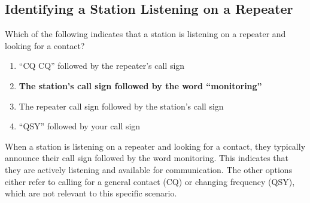 \subsection{Identifying a Station Listening on a Repeater}
\label{T2A09}

\begin{tcolorbox}[colback=gray!10!white,colframe=black!75!black,title=T2A09]
Which of the following indicates that a station is listening on a repeater and looking for a contact?
\begin{enumerate}[noitemsep]
    \item “CQ CQ” followed by the repeater’s call sign
    \item \textbf{The station’s call sign followed by the word “monitoring”}
    \item The repeater call sign followed by the station’s call sign
    \item “QSY” followed by your call sign
\end{enumerate}
\end{tcolorbox}

When a station is listening on a repeater and looking for a contact, they typically announce their call sign followed by the word monitoring. This indicates that they are actively listening and available for communication. The other options either refer to calling for a general contact (CQ) or changing frequency (QSY), which are not relevant to this specific scenario.